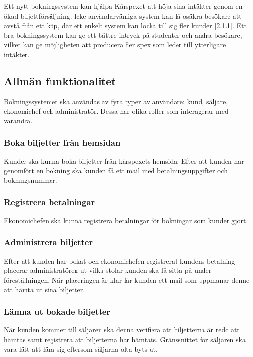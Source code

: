 \documentclass[a4paper, twoside, 11pt, titlepage]{article}
\begin{document}
	Ett nytt bokningssystem kan hjälpa Kårspexet att höja sina intäkter genom en ökad biljettförsäljning. Icke-användarvänliga system kan få osäkra besökare att avstå från ett köp, där ett enkelt system kan locka till sig fler kunder [2.1.1]. Ett bra bokningssystem kan ge ett bättre intryck på studenter och andra besökare, vilket kan ge möjligheten att producera fler spex som leder till ytterligare intäkter.

	\subsection{Allmän funktionalitet}


	Bokningssystemet ska användas av fyra typer av användare: kund, säljare, ekonomichef och administratör. Dessa har olika roller som interagerar med varandra.

		\subsubsection{Boka biljetter från hemsidan}


		Kunder ska kunna boka biljetter från kårspexets hemsida. Efter att kunden har genomfört en bokning ska kunden få ett mail med betalningsuppgifter och bokningsnummer.

		\subsubsection{Registrera betalningar}


		Ekonomichefen ska kunna registrera betalningar för bokningar som kunder gjort.

		\subsubsection{Administrera biljetter}


		Efter att kunden har bokat och ekonomichefen registrerat kundens betalning placerar administratören ut vilka stolar kunden ska få sitta på under föreställningen. När placeringen är klar får kunden ett mail som uppmanar denne att hämta ut sina biljetter.

		\subsubsection{Lämna ut bokade biljetter}


		När kunden kommer till säljaren ska denna verifiera att biljetterna är redo att hämtas samt registrera att biljetterna har hämtats. Gränssnittet för säljaren ska vara lätt att lära sig eftersom säljarna ofta byts ut.
\end{document}
